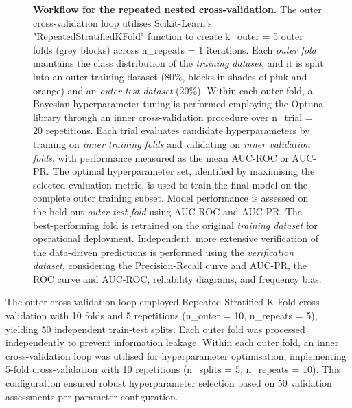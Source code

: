 \begin{figure}[htbp]
\caption{\textbf{Workflow for the repeated nested cross-validation.} The outer cross-validation loop utilises Scikit-Learn's "RepeatedStratifiedKFold" function to create k\_outer = 5 outer folds (grey blocks) across n\_repeats = 1 iterations. Each \textcolor{colourOuterFolds}{\textit{outer fold}} maintains the class distribution of the \textcolor{colourTraining}{\textit{training dataset}}, and it is split into an outer training dataset (80\%, blocks in shades of pink and orange) and an \textcolor{colourOuterTest}{\textit{outer test dataset}} (20\%). Within each outer fold, a Bayesian hyperparameter tuning is performed employing the Optuna library through an inner cross-validation procedure over n\_trial = 20 repetitions. Each trial evaluates candidate hyperparameters by training on \textcolor{colourInnerTraining}{\textit{inner training folds}} and validating on \textcolor{colourInnerValidation}{\textit{inner validation folds}}, with performance measured as the mean AUC-ROC or AUC-PR. The optimal hyperparameter set, identified by maximising the selected evaluation metric, is used to train the final model on the complete outer training subset. Model performance is assessed on the held-out \textcolor{colourOuterTest}{\textit{outer test fold}} using AUC-ROC and AUC-PR. The best-performing fold is retrained on the original \textcolor{colourTraining}{\textit{training dataset}} for operational deployment. Independent, more extensive verification of the data-driven predictions is performed using the \textcolor{colourTest}{\textit{verification dataset}}, considering the Precision-Recall curve and AUC-PR, the ROC curve and AUC-ROC, reliability diagrams, and frequency bias.}
\label{fig:cv_optuna}
\end{figure}

The outer cross-validation loop employed Repeated Stratified K-Fold cross-validation with 10 folds and 5 repetitions (n\_outer = 10, n\_repeats = 5), yielding 50 independent train-test splits. Each outer fold was processed independently to prevent information leakage.
Within each outer fold, an inner cross-validation loop was utilised for hyperparameter optimisation, implementing 5-fold cross-validation with 10 repetitions (n\_splits = 5, n\_repeats = 10). This configuration ensured robust hyperparameter selection based on 50 validation assessments per parameter configuration.


